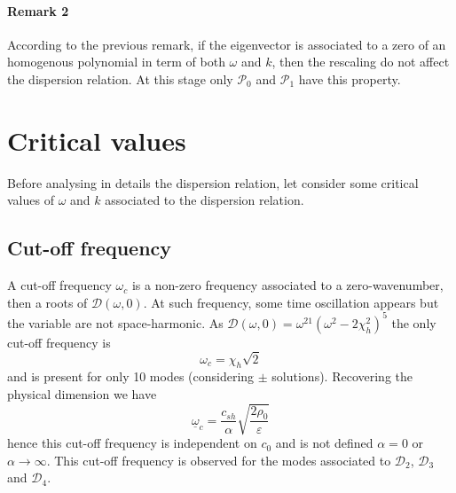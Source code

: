 \documentclass[
10pt, %
a4paper, %
oneside, %
headinclude,footinclude, %
table
]{scrartcl}
\begin{document}
\paragraph{\textbf{Remark 2}} According to the previous remark, if the eigenvector is associated to a zero of an homogenous polynomial in term of both $\omega$ and $k$, then  the rescaling do not affect the dispersion relation. At this stage only $\mathcal{P}_{0}$ and $\mathcal{P}_{1}$ have this property. 

\section{Critical values}
Before analysing in details the dispersion relation, let consider some critical values of $\omega$ and $k$ associated to the dispersion relation.
\subsection{Cut-off frequency}
A cut-off frequency $\omega_{c}$ is a non-zero frequency associated to a zero-wavenumber, then a roots of $\mathcal{D}(\omega,0)$. At such frequency, some time oscillation appears but the variable are not space-harmonic. As $\mathcal{D}(\omega,0)=\omega^{21}(\omega^2-2 \chi_{h}^2)^5$ the only cut-off frequency is 
$$
\boxed{\omega_{c}=\chi_{h}\sqrt{2}}
$$
 and is present for only 10 modes (considering $\pm$ solutions). Recovering the physical dimension we have
 $$
\underline{\omega}_{c}=\frac{c_{sh}}{\alpha} \sqrt{\frac{2\rho_{0}}{\varepsilon}}
 $$
 hence this cut-off frequency is independent on $c_{0}$ and is not defined $\alpha=0$ or $\alpha\to\infty$. This cut-off frequency is observed for the modes associated to $\mathcal{D}_{2}$, $\mathcal{D}_{3}$ and $\mathcal{D}_{4}$.
 
\end{document}
